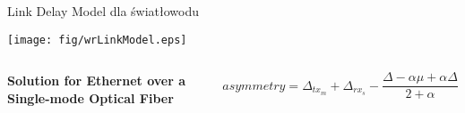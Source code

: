 \documentclass[compress,red]{beamer}
\begin{document}
\begin{frame}{Link Delay Model dla światłowodu}

  \begin{center}
  \texttt{[image: fig/wrLinkModel.eps]}
  \end{center}

  \begin{columns}[c]
  \column{1.5in}

    \begin{center}
      \textbf{Solution for Ethernet over a Single-mode Optical Fiber}
    \end{center}    

  \column{2.7in}

    \begin{equation}
      \nonumber asymmetry = \Delta_{tx_m} + \Delta_{rx_s} - \frac{\Delta - \alpha \mu + \alpha \Delta}{2 + \alpha}
    \end{equation}

  \end{columns}

\end{frame}
% 
% 
\end{document}
